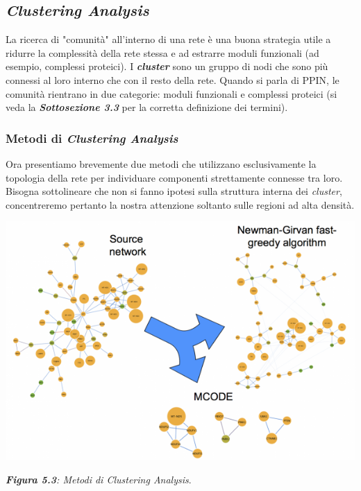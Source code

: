 \documentclass[11pt]{article}
\begin{document}
\subsection{\textit{Clustering Analysis}}
La ricerca di "comunità" all'interno di una rete è una buona strategia utile a ridurre la complessità della rete stessa e ad estrarre moduli funzionali (ad esempio, complessi proteici). I \textit{\textbf{cluster}} sono un gruppo di nodi che sono più connessi al loro interno che con il resto della rete. Quando si parla di PPIN, le comunità rientrano in due categorie: moduli funzionali e complessi proteici (si veda la \textit{\textbf{Sottosezione 3.3}} per la corretta definizione dei termini).

\subsubsection{Metodi di \textit{Clustering Analysis}}
Ora presentiamo brevemente due metodi che utilizzano esclusivamente la topologia della rete per individuare componenti strettamente connesse tra loro. Bisogna sottolineare che non si fanno ipotesi sulla struttura interna dei \textit{cluster}, concentreremo pertanto la nostra attenzione soltanto sulle regioni ad alta densità.

\begin{center}
\includegraphics[scale=0.6]{ng}

\begin{small}\textit{\textbf{Figura 5.3}: Metodi di Clustering Analysis}.\end{small}
\end{center}
\end{document}
